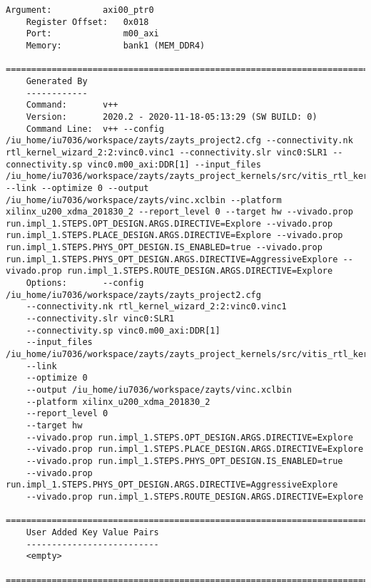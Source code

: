 \begin{lstlisting}[caption=Содержимое файла vinc.xclbin.info для измененного проекта, label={infof2}]
	Argument:          axi00_ptr0
	Register Offset:   0x018
	Port:              m00_axi
	Memory:            bank1 (MEM_DDR4)
	==============================================================================
	Generated By
	------------
	Command:       v++
	Version:       2020.2 - 2020-11-18-05:13:29 (SW BUILD: 0)
	Command Line:  v++ --config /iu_home/iu7036/workspace/zayts/zayts_project2.cfg --connectivity.nk rtl_kernel_wizard_2:2:vinc0.vinc1 --connectivity.slr vinc0:SLR1 --connectivity.sp vinc0.m00_axi:DDR[1] --input_files /iu_home/iu7036/workspace/zayts/zayts_project_kernels/src/vitis_rtl_kernel/rtl_kernel_wizard_2/rtl_kernel_wizard_2.xo --link --optimize 0 --output /iu_home/iu7036/workspace/zayts/vinc.xclbin --platform xilinx_u200_xdma_201830_2 --report_level 0 --target hw --vivado.prop run.impl_1.STEPS.OPT_DESIGN.ARGS.DIRECTIVE=Explore --vivado.prop run.impl_1.STEPS.PLACE_DESIGN.ARGS.DIRECTIVE=Explore --vivado.prop run.impl_1.STEPS.PHYS_OPT_DESIGN.IS_ENABLED=true --vivado.prop run.impl_1.STEPS.PHYS_OPT_DESIGN.ARGS.DIRECTIVE=AggressiveExplore --vivado.prop run.impl_1.STEPS.ROUTE_DESIGN.ARGS.DIRECTIVE=Explore 
	Options:       --config /iu_home/iu7036/workspace/zayts/zayts_project2.cfg
	--connectivity.nk rtl_kernel_wizard_2:2:vinc0.vinc1
	--connectivity.slr vinc0:SLR1
	--connectivity.sp vinc0.m00_axi:DDR[1]
	--input_files /iu_home/iu7036/workspace/zayts/zayts_project_kernels/src/vitis_rtl_kernel/rtl_kernel_wizard_2/rtl_kernel_wizard_2.xo
	--link
	--optimize 0
	--output /iu_home/iu7036/workspace/zayts/vinc.xclbin
	--platform xilinx_u200_xdma_201830_2
	--report_level 0
	--target hw
	--vivado.prop run.impl_1.STEPS.OPT_DESIGN.ARGS.DIRECTIVE=Explore
	--vivado.prop run.impl_1.STEPS.PLACE_DESIGN.ARGS.DIRECTIVE=Explore
	--vivado.prop run.impl_1.STEPS.PHYS_OPT_DESIGN.IS_ENABLED=true
	--vivado.prop run.impl_1.STEPS.PHYS_OPT_DESIGN.ARGS.DIRECTIVE=AggressiveExplore
	--vivado.prop run.impl_1.STEPS.ROUTE_DESIGN.ARGS.DIRECTIVE=Explore 
	==============================================================================
	User Added Key Value Pairs
	--------------------------
	<empty>
	==============================================================================
	
\end{lstlisting}  



